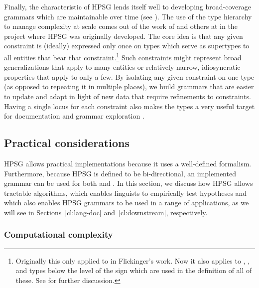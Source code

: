 \documentclass[output=paper,nonflat]{langsci/langscibook}
\begin{document}
Finally, the  characteristic of HPSG lends itself well to developing broad-coverage grammars which are maintainable over time (see \citealt{Syg:Win:11}). The use of the type hierarchy to manage complexity at scale comes out of the work of \citet{Flickinger87} and others at  in the project where HPSG was originally developed. The core idea is that any given constraint is (ideally) expressed only once on types which serve as supertypes to all entities that bear that constraint.\footnote{Originally this only applied to  in Flickinger's work. Now it also applies to , , and types below the level of the sign which are used in the definition of all of these. See  for further discussion.} Such constraints might represent broad generalizations that apply to many entities or relatively narrow, idiosyncratic properties that apply to only a few. By isolating any given constraint on one type (as opposed to repeating it in multiple places), we build grammars that are easier to update and adapt in light of new data that require refinements to constraints. Having a single locus for each constraint also makes the types a very useful target for documentation \citep{Hashimoto-etal:07} and grammar exploration \citep{Letcher:18}. 


\subsection{Practical considerations}
\label{cl:prac}

HPSG allows practical implementations
because it uses a well-defined formalism.
Furthermore, because HPSG is defined to be bi-directional,
an implemented grammar can be used for both  and .
In this section, we discuss how HPSG allows tractable algorithms,
which enables linguists to empirically test hypotheses
and which also enables HPSG grammars to be used in a range of applications,
as we will see in Sections~\ref{cl:lang-doc} and~\ref{cl:downstream}, respectively.

\subsubsection{Computational complexity}
\label{cl:prac:comp}

\end{document}

